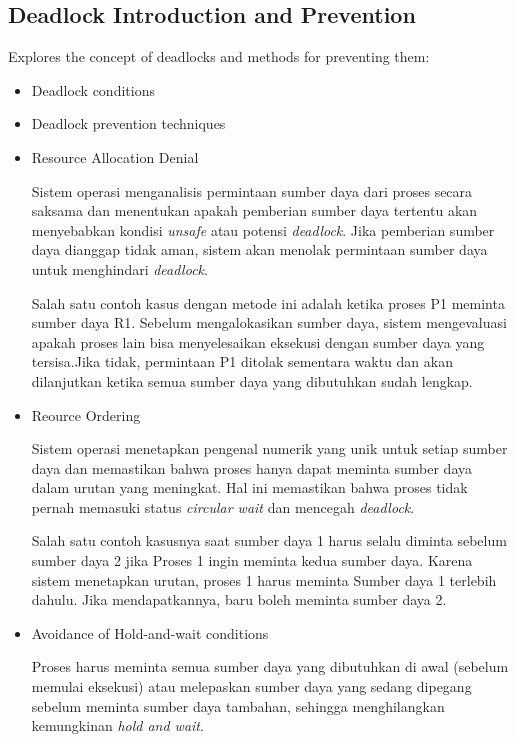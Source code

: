 \documentclass[12pt]{article}
\begin{document}
\subsection{Deadlock Introduction and Prevention}
Explores the concept of deadlocks and methods for preventing them:
\begin{itemize}
    \item Deadlock conditions
    \item Deadlock prevention techniques
    \item Resource Allocation Denial
        
    \hspace{1cm} Sistem operasi menganalisis permintaan sumber daya dari proses secara saksama dan menentukan  apakah pemberian sumber daya tertentu akan menyebabkan kondisi \textit{unsafe} atau potensi \textit{deadlock}. Jika pemberian sumber daya dianggap tidak aman, sistem akan menolak permintaan sumber daya untuk menghindari \textit{deadlock}. 
        
    \hspace{1cm}Salah satu contoh kasus dengan metode ini adalah ketika proses P1 meminta sumber daya R1. Sebelum mengalokasikan sumber daya, sistem mengevaluasi apakah proses lain bisa menyelesaikan eksekusi dengan sumber daya yang tersisa.Jika tidak, permintaan P1 ditolak sementara waktu dan akan dilanjutkan ketika semua sumber daya yang dibutuhkan sudah lengkap.
    
    \item Reource Ordering

    \hspace{1cm} Sistem operasi menetapkan pengenal numerik yang unik untuk setiap sumber daya dan memastikan bahwa proses hanya dapat meminta sumber daya dalam urutan yang meningkat. Hal ini memastikan bahwa proses tidak pernah memasuki status \textit{circular wait} dan mencegah \textit{deadlock}.
    
    \hspace{1cm} Salah satu contoh kasusnya saat sumber daya 1 harus selalu diminta sebelum sumber daya 2 jika Proses 1 ingin meminta kedua sumber daya. Karena sistem menetapkan urutan, proses 1 harus meminta Sumber daya 1 terlebih dahulu. Jika mendapatkannya, baru boleh meminta sumber daya 2.

    \item Avoidance of Hold-and-wait conditions

    \hspace{1cm} Proses harus meminta semua sumber daya yang dibutuhkan di awal (sebelum memulai eksekusi) atau melepaskan sumber daya yang sedang dipegang sebelum meminta sumber daya tambahan, sehingga menghilangkan kemungkinan \textit{hold and wait}.
    

\end{itemize}
\end{document}
